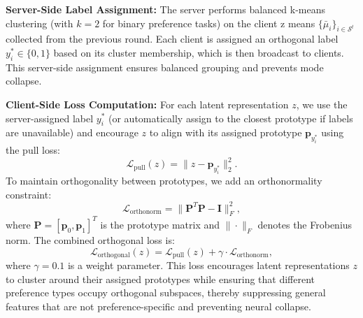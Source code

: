 \textbf{Server-Side Label Assignment:} The server performs balanced k-means clustering (with $k=2$ for binary preference tasks) on the client z means $\{\bar{\mu}_i\}_{i \in \mathcal{S}^t}$ collected from the previous round. Each client is assigned an orthogonal label $y_i^* \in \{0, 1\}$ based on its cluster membership, which is then broadcast to clients. This server-side assignment ensures balanced grouping and prevents mode collapse.

\textbf{Client-Side Loss Computation:} For each latent representation $z$, we use the server-assigned label $y_i^*$ (or automatically assign to the closest prototype if labels are unavailable) and encourage $z$ to align with its assigned prototype $\mathbf{p}_{y_i^*}$ using the pull loss:
\begin{equation}
    \mathcal{L}_{\text{pull}}(z) = \|z - \mathbf{p}_{y_i^*}\|_2^2.
\end{equation}
To maintain orthogonality between prototypes, we add an orthonormality constraint:
\begin{equation}
    \mathcal{L}_{\text{orthonorm}} = \|\mathbf{P}^T \mathbf{P} - \mathbf{I}\|_F^2,
\end{equation}
where $\mathbf{P} = [\mathbf{p}_0, \mathbf{p}_1]^T$ is the prototype matrix and $\|\cdot\|_F$ denotes the Frobenius norm. The combined orthogonal loss is:
\begin{equation}
    \mathcal{L}_{\text{orthogonal}}(z) = \mathcal{L}_{\text{pull}}(z) + \gamma \cdot \mathcal{L}_{\text{orthonorm}},
\end{equation}
where $\gamma = 0.1$ is a weight parameter. This loss encourages latent representations $z$ to cluster around their assigned prototypes while ensuring that different preference types occupy orthogonal subspaces, thereby suppressing general features that are not preference-specific and preventing neural collapse.

